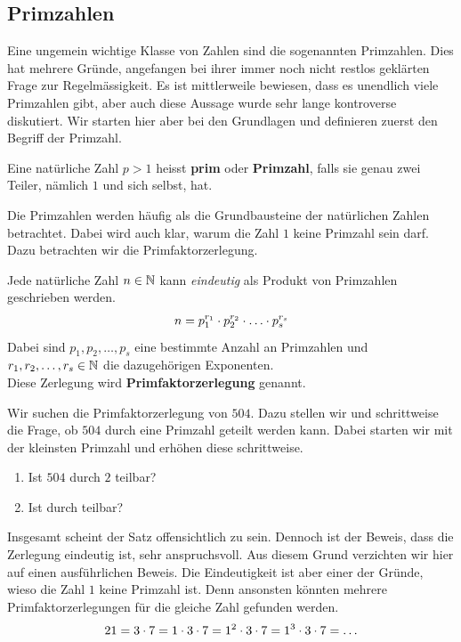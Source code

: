 \documentclass[11pt,oneside]{article}
\begin{document}
\subsection{Primzahlen}
    Eine ungemein wichtige Klasse von Zahlen sind die sogenannten Primzahlen. Dies hat mehrere Gründe, angefangen bei ihrer immer noch nicht restlos geklärten Frage zur Regelmässigkeit. Es ist mittlerweile bewiesen, dass es unendlich viele Primzahlen gibt, aber auch diese Aussage wurde sehr lange kontroverse diskutiert. Wir starten hier aber bei den Grundlagen und definieren zuerst den Begriff der Primzahl.
    \begin{definition}
        Eine natürliche Zahl $p>1$ heisst \textbf{prim} oder \textbf{Primzahl}, falls sie genau zwei Teiler, nämlich $1$ und sich selbst, hat.
    \end{definition}
    Die Primzahlen werden häufig als die Grundbausteine der natürlichen Zahlen betrachtet. Dabei wird auch klar, warum die Zahl $1$ keine Primzahl sein darf. Dazu betrachten wir die Primfaktorzerlegung.
    \begin{satz}
        Jede natürliche Zahl $n\in\mathbb{N}$ kann \emph{eindeutig} als Produkt von Primzahlen geschrieben werden.
        \[n=p_1^{r_1}\cdot p_2^{r_2}\cdot\ldots\cdot p_s^{r_s}\]
        Dabei sind $p_1,p_2,\ldots,p_s$ eine bestimmte Anzahl an Primzahlen und $r_1,r_2,\ldots,r_s\in\mathbb{N}$ die dazugehörigen Exponenten.\\
        Diese Zerlegung wird \textbf{Primfaktorzerlegung} genannt.
    \end{satz}
    \begin{beispiel}
        Wir suchen die Primfaktorzerlegung von $504$. Dazu stellen wir und schrittweise die Frage, ob $504$ durch eine Primzahl geteilt werden kann. Dabei starten wir mit der kleinsten Primzahl und erhöhen diese schrittweise.
        \begin{enumerate}
            \item Ist $504$ durch $2$ teilbar?
            \item Ist  durch  teilbar?
        \end{enumerate}
    \end{beispiel}
    Insgesamt scheint der Satz offensichtlich zu sein. Dennoch ist der Beweis, dass die Zerlegung eindeutig ist, sehr anspruchsvoll. Aus diesem Grund verzichten wir hier auf einen ausführlichen Beweis. Die Eindeutigkeit ist aber einer der Gründe, wieso die Zahl $1$ keine Primzahl ist. Denn ansonsten könnten mehrere Primfaktorzerlegungen für die gleiche Zahl gefunden werden. \[21=3\cdot7=1\cdot3\cdot7=1^2\cdot3\cdot7=1^3\cdot3\cdot7=\ldots\]
\end{document}
